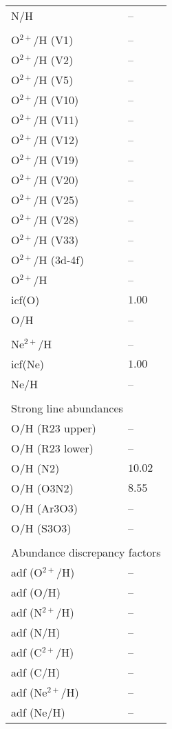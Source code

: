\begin{longtable}[l]{ll}
 N/H                                 & -- \\
 \\
 O$^{2+}$/H (V1)                     & -- \\
 O$^{2+}$/H (V2)                     & -- \\
 O$^{2+}$/H (V5)                     & -- \\
 O$^{2+}$/H (V10)                    & -- \\
 O$^{2+}$/H (V11)                    & -- \\
 O$^{2+}$/H (V12)                    & -- \\
 O$^{2+}$/H (V19)                    & -- \\
 O$^{2+}$/H (V20)                    & -- \\
 O$^{2+}$/H (V25)                    & -- \\
 O$^{2+}$/H (V28)                    & -- \\
 O$^{2+}$/H (V33)                    & -- \\
 O$^{2+}$/H (3d-4f)                  & -- \\
 O$^{2+}$/H                          & -- \\
 icf(O)                              & $  1.00$\\
 O/H                                 & -- \\
 \\
 Ne$^{2+}$/H                         & -- \\
 icf(Ne)                             & $  1.00$\\
 Ne/H                                & -- \\
 \vspace{0.2cm}\\\multicolumn{2}{l}{Strong line abundances}\\ \hline
 O/H (R23 upper)                     & -- \\
 O/H (R23 lower)                     & -- \\
 O/H (N2)                            & $ 10.02$\\
 O/H (O3N2)                          & $  8.55$\\
 O/H (Ar3O3)                         & -- \\
 O/H (S3O3)                          & -- \\
 \vspace{0.2cm}\\\multicolumn{2}{l}{Abundance discrepancy factors}\\ \hline
 adf (O$^{2+}$/H)                    & -- \\
 adf (O/H)                           & -- \\
 adf (N$^{2+}$/H)                    & -- \\
 adf (N/H)                           & -- \\
 adf (C$^{2+}$/H)                    & -- \\
 adf (C/H)                           & -- \\
 adf (Ne$^{2+}$/H)                   & -- \\
 adf (Ne/H)                          & -- \\
 \end{longtable}
